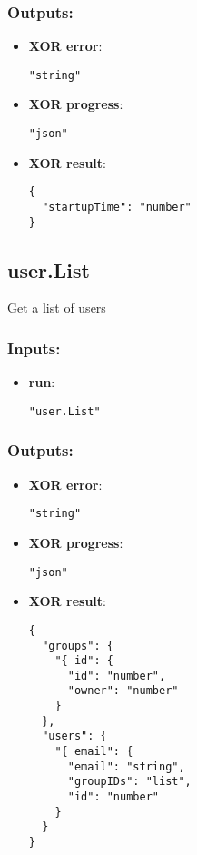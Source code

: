 \subsubsection*{Outputs:}
\begin{itemize}
    \item \textbf{XOR error}: 
\begin{lstlisting}
"string"
\end{lstlisting}
    \item \textbf{XOR progress}: 
\begin{lstlisting}
"json"
\end{lstlisting}
    \item \textbf{XOR result}: 
\begin{lstlisting}
{
  "startupTime": "number"
}
\end{lstlisting}
  \end{itemize}

\subsection{user.List}
Get a list of users
\subsubsection*{Inputs:}
\begin{itemize}
    \item \textbf{run}: 
\begin{lstlisting}
"user.List"
\end{lstlisting}
  \end{itemize}

\subsubsection*{Outputs:}
\begin{itemize}
    \item \textbf{XOR error}: 
\begin{lstlisting}
"string"
\end{lstlisting}
    \item \textbf{XOR progress}: 
\begin{lstlisting}
"json"
\end{lstlisting}
    \item \textbf{XOR result}: 
\begin{lstlisting}
{
  "groups": {
    "{ id": {
      "id": "number", 
      "owner": "number"
    }
  }, 
  "users": {
    "{ email": {
      "email": "string", 
      "groupIDs": "list", 
      "id": "number"
    }
  }
}
\end{lstlisting}
  \end{itemize}

